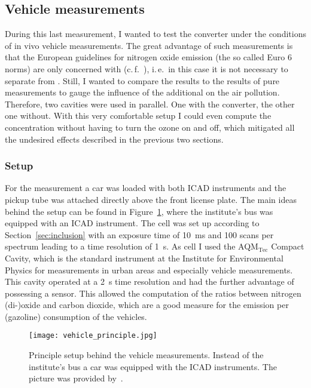 \subsection{Vehicle measurements}
\label{sec:vehicle}

During this last measurement, I wanted to test the converter under the
conditions of in vivo vehicle measurements. The great advantage of
such measurements is that the European guidelines for nitrogen oxide
emission (the so called Euro 6 norms) are only concerned with
 (c.\,f.~\cite{eu}), i.\,e.\ in this case it is not necessary
to separate  from . Still, I wanted to compare the
 results to the results of pure  measurements to
gauge the influence of the additional  on the air
pollution. Therefore, two cavities were used in parallel. One with the
converter, the other one without. With this very comfortable setup I
could even compute the  concentration without having to turn
the ozone on and off, which mitigated all the undesired effects
described in the previous two sections.

\subsubsection{Setup}
\label{sec:vehicle-setup}

For the measurement a car was loaded with both ICAD instruments and
the pickup tube was attached directly above the front license
plate. The main ideas behind the setup can be found in
Figure~\ref{fig:hd-principle}, where the institute's bus was equipped
with an ICAD instrument. The  cell was set up according to
Section~\ref{sec:inclusion} with an exposure time of
\SI{10}{\milli\second} and 100 scans per spectrum leading to a time
resolution of \SI{1}{\second}. As  cell I used the
AQM$_{\text{Tec}}$ Compact Cavity, which is the standard instrument at the
Institute for Environmental Physics for  measurements in urban
areas and especially vehicle measurements. This cavity operated at a
\SI{2}{\second} time resolution and had the further advantage of
possessing a  sensor. This allowed the computation of the
ratios between nitrogen (di-)oxide and carbon dioxide, which are a
good measure for the emission per (gazoline) consumption of the
vehicles.

\begin{figure}[htbp]
  \centering
  \texttt{[image: vehicle\_principle.jpg]}
  \caption{Principle setup behind the vehicle measurements. Instead of
    the institute's bus a car was equipped with the ICAD
    instruments. The picture was provided by~\cite{denis}.}
  \label{fig:hd-principle}
\end{figure}

